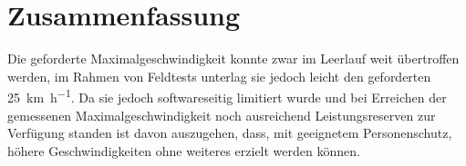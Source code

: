 \chapter{Zusammenfassung}
	Die geforderte Maximalgeschwindigkeit konnte zwar im Leerlauf weit übertroffen werden, im Rahmen von Feldtests unterlag sie jedoch leicht den geforderten \qty{25}{\kilo\metre\per\hour}.
	Da sie jedoch softwareseitig limitiert wurde und bei Erreichen der gemessenen Maximalgeschwindigkeit noch ausreichend Leistungsreserven zur Verfügung standen ist davon auszugehen, dass, mit geeignetem Personenschutz, höhere Geschwindigkeiten ohne weiteres erzielt werden können.